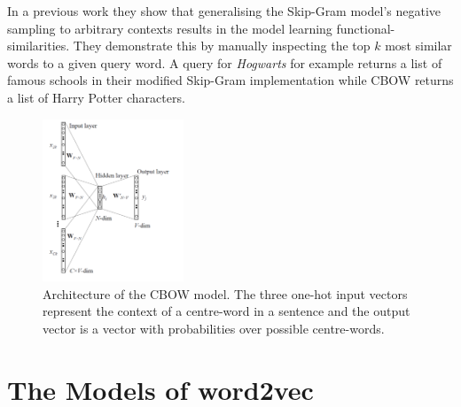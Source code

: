 \documentclass[conference]{IEEEtran}
\begin{document}
In a previous work \cite{levy2014dependency} they show that generalising the Skip-Gram 
model's negative sampling to arbitrary contexts results in the model learning 
functional-similarities. They demonstrate this by manually inspecting the top $k$ most 
similar words to a given query word. A query for  \textit{Hogwarts} for example returns 
a list of famous schools in their modified Skip-Gram implementation while CBOW returns 
a list of Harry Potter characters.

\begin{figure}[t]
\centering
\includegraphics[width=0.375\textwidth]{cbow}
\caption{Architecture of the CBOW model. The three one-hot input vectors represent the context 
of a centre-word in a sentence and the output vector is a vector with probabilities over possible 
centre-words. }
\label{fig:cbow}
\end{figure}

\section{The Models of word2vec}
\label{sec:model}
\end{document}
